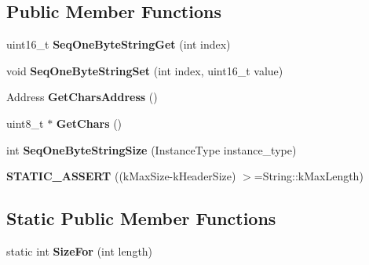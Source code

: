 \subsection*{Public Member Functions}
\begin{DoxyCompactItemize}
\item 
uint16\+\_\+t {\bfseries Seq\+One\+Byte\+String\+Get} (int index)\hypertarget{classv8_1_1internal_1_1_seq_one_byte_string_aaa3a16437c74c545b56f8779b2eaf15e}{}\label{classv8_1_1internal_1_1_seq_one_byte_string_aaa3a16437c74c545b56f8779b2eaf15e}

\item 
void {\bfseries Seq\+One\+Byte\+String\+Set} (int index, uint16\+\_\+t value)\hypertarget{classv8_1_1internal_1_1_seq_one_byte_string_ace86c2c7439753b6bb6cb9a370c4ca2e}{}\label{classv8_1_1internal_1_1_seq_one_byte_string_ace86c2c7439753b6bb6cb9a370c4ca2e}

\item 
Address {\bfseries Get\+Chars\+Address} ()\hypertarget{classv8_1_1internal_1_1_seq_one_byte_string_aa393da023be3fd046b02c0ee11aa25db}{}\label{classv8_1_1internal_1_1_seq_one_byte_string_aa393da023be3fd046b02c0ee11aa25db}

\item 
uint8\+\_\+t $\ast$ {\bfseries Get\+Chars} ()\hypertarget{classv8_1_1internal_1_1_seq_one_byte_string_a1a46b1bf7e4321041b3b4b33bb9d2b94}{}\label{classv8_1_1internal_1_1_seq_one_byte_string_a1a46b1bf7e4321041b3b4b33bb9d2b94}

\item 
int {\bfseries Seq\+One\+Byte\+String\+Size} (Instance\+Type instance\+\_\+type)\hypertarget{classv8_1_1internal_1_1_seq_one_byte_string_aa9fa09a5fbd9160f053ba6c0edbd10c2}{}\label{classv8_1_1internal_1_1_seq_one_byte_string_aa9fa09a5fbd9160f053ba6c0edbd10c2}

\item 
{\bfseries S\+T\+A\+T\+I\+C\+\_\+\+A\+S\+S\+E\+RT} ((k\+Max\+Size-\/k\+Header\+Size) $>$=String\+::k\+Max\+Length)\hypertarget{classv8_1_1internal_1_1_seq_one_byte_string_a1297a6eb07f2b9b66d9235769dd6e947}{}\label{classv8_1_1internal_1_1_seq_one_byte_string_a1297a6eb07f2b9b66d9235769dd6e947}

\end{DoxyCompactItemize}
\subsection*{Static Public Member Functions}
\begin{DoxyCompactItemize}
\item 
static int {\bfseries Size\+For} (int length)\hypertarget{classv8_1_1internal_1_1_seq_one_byte_string_a8c149d283d3bc8e22fd909bb6687da7f}{}\label{classv8_1_1internal_1_1_seq_one_byte_string_a8c149d283d3bc8e22fd909bb6687da7f}

\end{DoxyCompactItemize}
